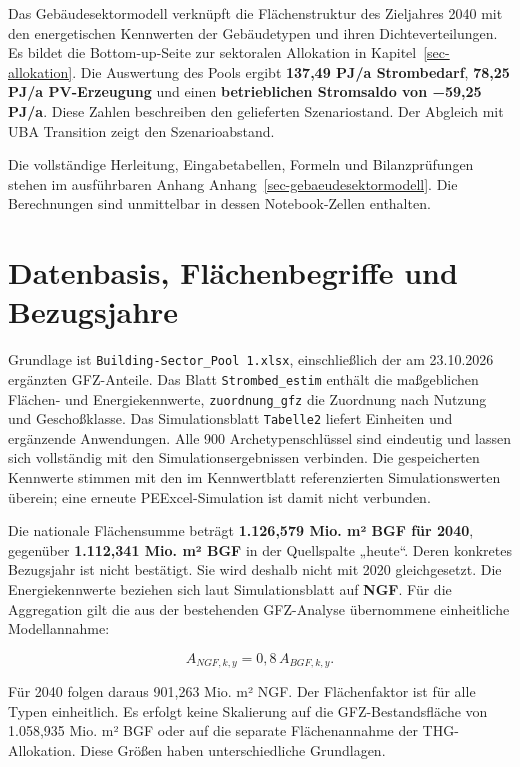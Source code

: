 \documentclass[
  ngerman,
  a4paper,
  DIV=11]{scrreprt}
\begin{document}
Das Gebäudesektormodell verknüpft die Flächenstruktur des Zieljahres
2040 mit den energetischen Kennwerten der Gebäudetypen und ihren
Dichteverteilungen. Es bildet die Bottom-up-Seite zur sektoralen
Allokation in Kapitel~\ref{sec-allokation}. Die Auswertung des Pools
ergibt \textbf{137,49 PJ/a Strombedarf}, \textbf{78,25 PJ/a
PV-Erzeugung} und einen \textbf{betrieblichen Stromsaldo von −59,25
PJ/a}. Diese Zahlen beschreiben den gelieferten Szenariostand. Der
Abgleich mit UBA Transition zeigt den Szenarioabstand.

Die vollständige Herleitung, Eingabetabellen, Formeln und
Bilanzprüfungen stehen im ausführbaren Anhang
Anhang~\ref{sec-gebaeudesektormodell}. Die Berechnungen sind unmittelbar
in dessen Notebook-Zellen enthalten.

\section{Datenbasis, Flächenbegriffe und
Bezugsjahre}\label{datenbasis-fluxe4chenbegriffe-und-bezugsjahre}

Grundlage ist \texttt{Building-Sector\_Pool\ 1.xlsx}, einschließlich der
am 23.10.2026 ergänzten GFZ-Anteile. Das Blatt \texttt{Strombed\_estim}
enthält die maßgeblichen Flächen- und Energiekennwerte,
\texttt{zuordnung\_gfz} die Zuordnung nach Nutzung und Geschoßklasse.
Das Simulationsblatt \texttt{Tabelle2} liefert Einheiten und ergänzende
Anwendungen. Alle 900 Archetypenschlüssel sind eindeutig und lassen sich
vollständig mit den Simulationsergebnissen verbinden. Die gespeicherten
Kennwerte stimmen mit den im Kennwertblatt referenzierten
Simulationswerten überein; eine erneute PEExcel-Simulation ist damit
nicht verbunden.

Die nationale Flächensumme beträgt \textbf{1.126,579 Mio. m² BGF für
2040}, gegenüber \textbf{1.112,341 Mio. m² BGF} in der Quellspalte
„heute``. Deren konkretes Bezugsjahr ist nicht bestätigt. Sie wird
deshalb nicht mit 2020 gleichgesetzt. Die Energiekennwerte beziehen sich
laut Simulationsblatt auf \textbf{NGF}. Für die Aggregation gilt die aus
der bestehenden GFZ-Analyse übernommene einheitliche Modellannahme:

\[
A_{NGF,k,y}=0{,}8\,A_{BGF,k,y}.
\]

Für 2040 folgen daraus 901,263 Mio. m² NGF. Der Flächenfaktor ist für
alle Typen einheitlich. Es erfolgt keine Skalierung auf die
GFZ-Bestandsfläche von 1.058,935 Mio. m² BGF oder auf die separate
Flächenannahme der THG-Allokation. Diese Größen haben unterschiedliche
Grundlagen.
\end{document}
